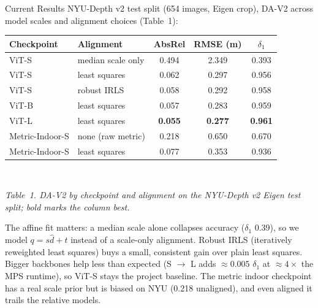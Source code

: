 \documentclass[11pt]{article}
\newcommand{\captext}[1]{{\fontsize{8.5}{10}\selectfont\itshape #1\par}}
\begin{document}
\begin{reportbox}{Current Results}
NYU-Depth v2 test split (654 images, Eigen crop), DA-V2 across model
scales and alignment choices (Table~1):
\begin{center}
\begin{tabular}{llccc}
\toprule
Checkpoint & Alignment & AbsRel & RMSE (m) & $\delta_1$ \\
\midrule
ViT-S & median scale only & 0.494 & 2.349 & 0.393 \\
ViT-S & least squares & 0.062 & 0.297 & 0.956 \\
ViT-S & robust IRLS & 0.058 & 0.292 & 0.958 \\
ViT-B & least squares & 0.057 & 0.283 & 0.959 \\
ViT-L & least squares & \textbf{0.055} & \textbf{0.277} & \textbf{0.961} \\
Metric-Indoor-S & none (raw metric) & 0.218 & 0.650 & 0.670 \\
Metric-Indoor-S & least squares & 0.077 & 0.353 & 0.936 \\
\bottomrule
\end{tabular}\\[2pt]
\captext{Table~1. DA-V2 by checkpoint and alignment on the NYU-Depth
v2 Eigen test split; bold marks the column best.}
\end{center}
The affine fit matters: a median scale alone collapses accuracy
($\delta_1$ 0.39), so we model $q = s\hat d + t$ instead of a
scale-only alignment. Robust IRLS (iteratively reweighted least
squares) buys a small, consistent gain over plain least squares.
Bigger backbones help less than expected (S $\to$ L adds
$\approx 0.005$ $\delta_1$ at ${\approx}4\times$ the MPS runtime), so ViT-S
stays the project baseline. The metric indoor checkpoint has a real
scale prior but is biased on NYU (0.218 unaligned), and even aligned
it trails the relative models.


\end{reportbox}
\end{document}
